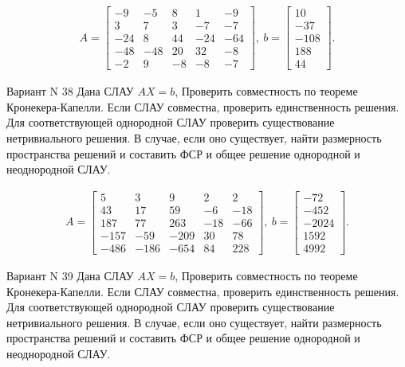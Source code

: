 \documentclass[11pt]{report}
\begin{document}
\begin{align*}
 A = \left[\begin{matrix}-9 & -5 & 8 & 1 & -9\\3 & 7 & 3 & -7 & -7\\-24 & 8 & 44 & -24 & -64\\-48 & -48 & 20 & 32 & -8\\-2 & 9 & -8 & -8 & -7\end{matrix}\right],
\ b = \left[\begin{matrix}10\\-37\\-108\\188\\44\end{matrix}\right]. 
 \end{align*}

Вариант N 38
Дана СЛАУ $AX = b$,
Проверить совместность по теореме Кронекера-Капелли. Если СЛАУ совместна, проверить единственность решения.
Для соответствующей однородной СЛАУ проверить существование нетривиального решения. В случае, если оно существует,
найти размерность пространства решений и составить ФСР и общее решение однородной  и неоднородной СЛАУ.


\begin{align*}
 A = \left[\begin{matrix}5 & 3 & 9 & 2 & 2\\43 & 17 & 59 & -6 & -18\\187 & 77 & 263 & -18 & -66\\-157 & -59 & -209 & 30 & 78\\-486 & -186 & -654 & 84 & 228\end{matrix}\right],
\ b = \left[\begin{matrix}-72\\-452\\-2024\\1592\\4992\end{matrix}\right]. 
 \end{align*}

Вариант N 39
Дана СЛАУ $AX = b$,
Проверить совместность по теореме Кронекера-Капелли. Если СЛАУ совместна, проверить единственность решения.
Для соответствующей однородной СЛАУ проверить существование нетривиального решения. В случае, если оно существует,
найти размерность пространства решений и составить ФСР и общее решение однородной  и неоднородной СЛАУ.
\end{document}
